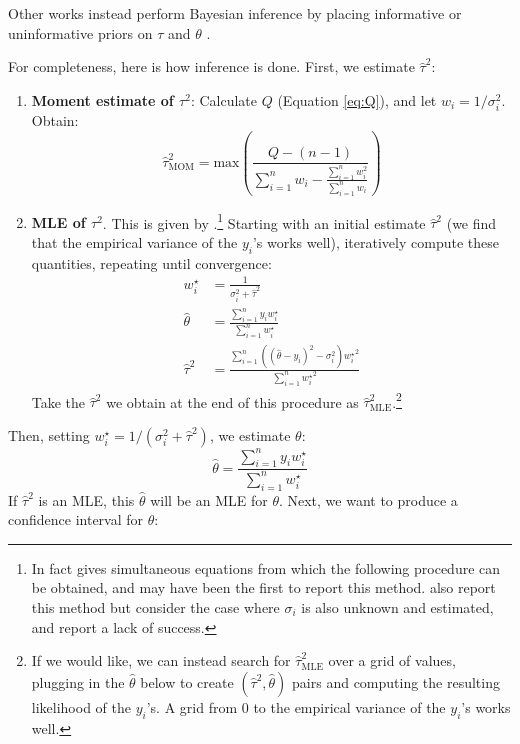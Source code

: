 \documentclass[letterpaper,12pt]{article}
\begin{document}
Other works instead perform Bayesian inference by placing informative or uninformative priors on $\tau$ and $\theta$ \citep{sutton2001bayesian}.

For completeness, here is how inference is done. First, we estimate $\hat\tau^2$:

\begin{enumerate}
  \item \textbf{Moment estimate of $\tau^2$}: Calculate $Q$ (Equation \ref{eq:Q}), and let $w_i=1/\sigma_i^2$. Obtain:
  \begin{equation}
    \hat\tau^2_{\mathrm{MOM}}=\mathrm{max}\left(\frac{Q-(n-1)}{\sum_{i=1}^nw_i - \frac{\sum_{i=1}^nw_i^2}{\sum_{i=1}^nw_i}}\right)
  \end{equation}
  \item \textbf{MLE of $\tau^2$}. This is given by \citet[eq.~8-9]{hardy1996likelihood}.\footnote{In fact
  \citet[pg.~113]{cochran1937problems} gives simultaneous equations from which the following procedure can be obtained, and may have been the first to report this method. \citet[Section 2.8]{rao1981estimators} also report this method but consider the case where $\sigma_i$ is also unknown and estimated, and report a lack of success.
  } Starting with an initial estimate $\hat\tau^2$ (we find that the empirical variance of the $y_i$'s works well), iteratively compute these quantities, repeating until convergence:
  \begin{align*}
  w_i^\star &= \frac{1}{\sigma_i^2+\hat\tau^2}\\
  \hat\theta &= \frac{\sum_{i=1}^n y_iw_i^\star}{\sum_{i=1}^n w_i^\star}\\
  \hat\tau^2 &= \frac{\sum_{i=1}^n ((\hat\theta-y_i)^2-\sigma_i^2){w_i^\star}^2}{\sum_{i=1}^n {w_i^\star}^2}
  \end{align*}
  Take the $\hat\tau^2$ we obtain at the end of this procedure as $\hat\tau^2_{\mathrm{MLE}}$.\footnote{If we would like, we can instead search for $\hat\tau^2_{\mathrm{MLE}}$ over a grid of values, plugging in the $\hat\theta$ below to create $(\hat\tau^2,\hat\theta)$ pairs and computing the resulting likelihood of the $y_i$'s. A grid from $0$ to the empirical variance of the $y_i$'s works well.}
\end{enumerate}
Then, setting $w_i^\star=1/(\sigma_i^2+\hat\tau^2)$, we estimate $\theta$:
\begin{equation}
  \hat\theta=\frac{\sum_{i=1}^ny_iw_i^\star}{\sum_{i=1}^nw_i^\star}
\end{equation}
If $\hat\tau^2$ is an MLE, this $\hat\theta$ will be an MLE for $\theta$. Next, we want to produce a confidence interval for $\theta$:
\end{document}
